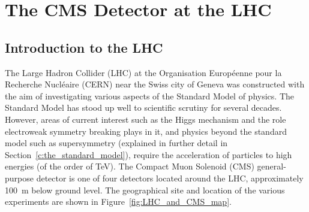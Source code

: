 \chapter{The CMS Detector at the LHC}
\label{c:CMS_Detector}

\section{Introduction to the LHC}
\label{s:Introduction}
The Large Hadron Collider (LHC) at the Organisation Europ\'{e}enne pour la Recherche Nucl\'{e}aire (CERN) near
the Swiss city of Geneva was constructed with the aim of investigating various aspects of the Standard Model
of physics. The Standard Model has stood up well to scientific scrutiny for several decades.
However, areas of current interest such as the Higgs mechanism and the role electroweak symmetry breaking
plays in it, and physics beyond the standard model such as supersymmetry (explained in further detail in
Section~\ref{c:the_standard_model}), require the acceleration of particles to high energies (of the order of
TeV). The Compact Muon Solenoid (CMS) general-purpose detector is one of four detectors located around the
LHC, approximately 100~m below ground level. The geographical site and location of the various experiments are
shown in Figure~\ref{fig:LHC_and_CMS_map}.

